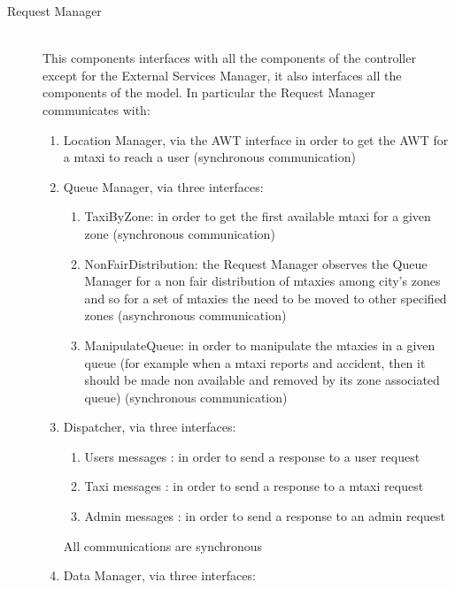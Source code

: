 \documentclass[11pt,titlepage]{article} %
\begin{document}
\begin{description}
      \item [Request Manager] \hfill \\
          This components interfaces with all the components of the controller except for the External Services Manager, it also interfaces
          all the components of the model.
          In particular the Request Manager communicates with:
	\begin{enumerate}
	            \item Location Manager, via the AWT interface in order to get the AWT for a mtaxi to reach a user
	            (synchronous communication)
	            \item Queue Manager, via three interfaces:
		 \begin{enumerate}
		                \item TaxiByZone: in order to get the first available mtaxi for a given zone
		                (synchronous communication)
		                \item NonFairDistribution: the Request Manager observes the Queue Manager for a non fair distribution of mtaxies among city's zones and so for a set of mtaxies
		                the need to be moved to other specified zones
		                (asynchronous communication)
		                \item ManipulateQueue: in order to manipulate the mtaxies in a given queue (for example when a mtaxi reports and accident, then it should be
		                made non available and removed by its zone associated queue)
		                (synchronous communication)
		\end{enumerate}
	          \item Dispatcher, via three interfaces:\newline
		\begin{enumerate}
	                \item Users messages : in order to send a response to a user request
	                \item Taxi messages : in order to send a response to a mtaxi request
	                \item Admin messages : in order to send a response to an admin request
		\end{enumerate}
	  	All communications are synchronous
	          \item Data Manager, via three interfaces:\newline


\end{enumerate}
\end{description}
\end{document}

